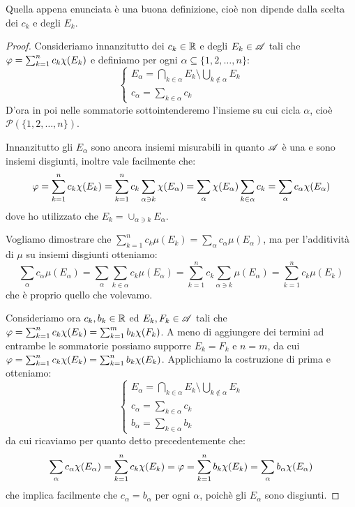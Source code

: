 \begin{remark}\label{BuonaDefIntSemp}
	Quella appena enunciata è una buona definizione, cioè non dipende dalla scelta dei $c_k$ e degli $E_k$.
\end{remark}
\begin{proof}
	Consideriamo innanzitutto dei $c_k\in \mathbb R$ e degli $E_k\in \mathscr A$ tali che $\varphi=\sum_{k=1}^nc_k\chi(E_k)$ e definiamo per ogni $\alpha\subseteq\{1,2,\dots,n\}$:
	\begin{equation*}
		\begin{cases}
			E_\alpha=\bigcap_{k\in\alpha}E_k\setminus \bigcup_{k\not\in \alpha} E_k\\
			c_\alpha=\sum_{k\in\alpha} c_k
		\end{cases}
	\end{equation*}
	D'ora in poi nelle sommatorie sottointenderemo l'insieme su cui cicla $\alpha$, cioè $\mathcal{P}(\{1,2,\dots,n\})$.
	
	Innanzitutto gli $E_\alpha$ sono ancora insiemi misurabili in quanto $\mathscr A$ è una \sigalg{} e sono insiemi disgiunti, inoltre vale facilmente che:
	\begin{equation*}
		\varphi=\sum_{k=1}^nc_k\chi(E_k)=\sum_{k=1}^nc_k\sum_{\alpha\ni k}\chi(E_\alpha)=\sum_\alpha \chi(E_\alpha)\sum_{k\in\alpha}c_k=\sum_\alpha c_\alpha\chi(E_\alpha)
	\end{equation*}
	dove ho utilizzato che $E_k=\cup_{\alpha\ni k} E_\alpha$.

	Vogliamo dimostrare che $\sum_{k=1}^nc_k\mu(E_k)=\sum_{\alpha}c_\alpha\mu(E_\alpha)$, ma per l'additività di $\mu$ su insiemi disgiunti otteniamo:
	\begin{equation}\label{RaffinamentoIntegrale}
		\sum_\alpha c_\alpha\mu(E_\alpha)=\sum_\alpha \sum_{k\in\alpha}c_k\mu(E_\alpha)=\sum_{k=1}^n c_k\sum_{\alpha \ni k} \mu(E_\alpha)=\sum_{k=1}^n c_k \mu(E_k)
	\end{equation}
	che è proprio quello che volevamo.
	
	Consideriamo ora $c_k, b_k\in\mathbb R$ ed $E_k,F_k\in\mathscr A$ tali che $\varphi=\sum_{k=1}^nc_k\chi(E_k)=\sum_{k=1}^mb_k\chi(F_k)$. A meno di aggiungere dei termini ad entrambe le sommatorie possiamo supporre $E_k=F_k$ e $n=m$, da cui $\varphi=\sum_{k=1}^nc_k\chi(E_k)=\sum_{k=1}^nb_k\chi(E_k)$. Applichiamo la costruzione di prima e otteniamo:
	\begin{equation*}
		\begin{cases}
			E_\alpha=\bigcap_{k\in\alpha}E_k\setminus \bigcup_{k\not\in \alpha} E_k\\
			c_\alpha=\sum_{k\in\alpha} c_k\\
			b_\alpha=\sum_{k\in\alpha} b_k
		\end{cases}
	\end{equation*}
	da cui ricaviamo per quanto detto precedentemente che:
	\begin{equation}
		\sum_\alpha c_\alpha\chi(E_\alpha)=\sum_{k=1}^nc_k\chi(E_k)=\varphi=\sum_{k=1}^nb_k\chi(E_k)=\sum_\alpha b_\alpha\chi(E_\alpha)
	\end{equation}
	che implica facilmente che $c_\alpha=b_\alpha$ per ogni $\alpha$, poichè gli $E_\alpha$ sono disgiunti.
	

\end{proof}
